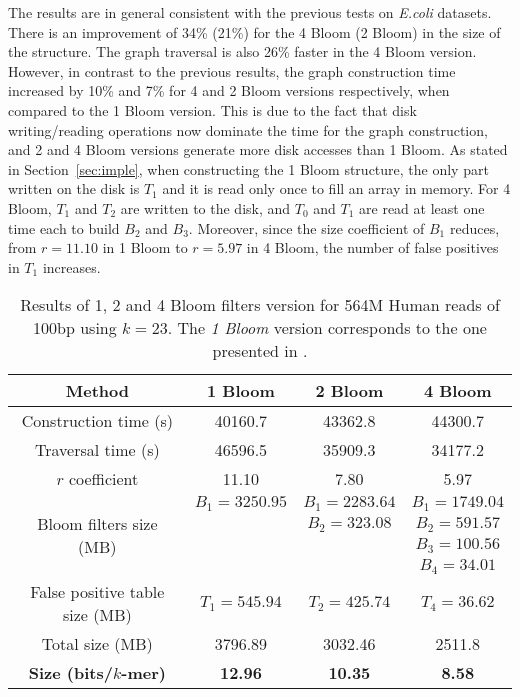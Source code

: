 \documentclass[pdftex]{llncs}\usepackage[T1]{fontenc}
\begin{document}
The results are in general consistent with the previous tests on
\emph{E.coli} datasets. There is an improvement of 34\% (21\%) for the
4 Bloom (2 Bloom) in the size of the structure. The graph traversal is
also 26\% faster in the 4 Bloom version. However, in contrast to the
previous results, the graph construction time {increased} by 10\% and
7\% for 4 and 2 Bloom versions respectively, when compared to the 1
Bloom version. This is due to the fact that disk writing/reading
operations now dominate the time for the graph construction, and 2 and
4 Bloom versions generate more disk accesses than 1 Bloom.  As stated
in Section~\ref{sec:imple}, when constructing the 1 Bloom structure,
the only part written on the disk is $T_1$ and it is read only once to
fill an array in memory. For 4 Bloom, $T_1$ and $T_2$ are written to
the disk, and $T_0$ and $T_1$ are read at least one time each to build
$B_2$ and $B_3$. Moreover, since the size coefficient of $B_1$
reduces, from $r = 11.10$ in 1 Bloom to $r = 5.97$ in 4 Bloom, the
number of false positives in $T_1$ increases.


\begin{table}[htbp]
\begin{center}
\begin{tabular}{|c|c|c|c|}
\hline
Method                          & 1 Bloom & 2 Bloom & 4 Bloom \\
\hline \hline
Construction time (s)           &  40160.7 & 43362.8 & 44300.7 \\
\hline
Traversal time (s)              &  46596.5 & 35909.3 & 34177.2 \\
\hline
$r$ coefficient                      &  11.10 &  7.80    & 5.97 \\
\hline
\multirow{4}{*}{Bloom filters size (MB)}  &  $B_1 = 3250.95$ & $B_1 = 2283.64$ & $B_1 = 1749.04$  \\
                                          &                  & $B_2 = 323.08$  & $B_2 = 591.57$ \\
                                          &                  &                 & $B_3 = 100.56$  \\
                                          &                  &                 & $B_4 = 34.01$ \\
\hline
False positive table size (MB)  &  $T_1 = 545.94$ & $T_2 = 425.74$ & $T_4 = 36.62$ \\
\hline
Total size (MB)                 &  3796.89 & 3032.46 & 2511.8 \\
\hline
\bf Size (bits/$k$-mer)             & \bf 12.96 & \bf 10.35 & {\bf 8.58} \\
\hline
\end{tabular}
\end{center}
\caption{Results of 1, 2 and 4 Bloom filters version for 564M Human
  reads of 100bp using $k = 23$. The \emph{1 Bloom} version
  corresponds to the one presented in
  \cite{DBLP:conf/wabi/ChikhiR12}. }\label{tab:human}
\end{table}
\end{document}
